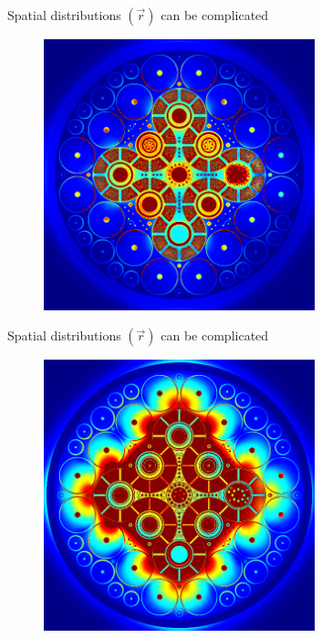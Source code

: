 \documentclass{beamer}
\begin{document}
        \begin{frame}{Spatial distributions $(\vec r)$ can be complicated}
            \begin{figure}
                \centering
                \includegraphics[width=0.7\textwidth]{./img/spaceFlux1.png}
                \caption*{}
            \end{figure}
        \end{frame}

        \begin{frame}{Spatial distributions $(\vec r)$ can be complicated}
            \begin{figure}
                \centering
                \includegraphics[width=0.7\textwidth]{./img/spaceFlux2.png}
                \caption*{}
            \end{figure}
        \end{frame}
\end{document}
